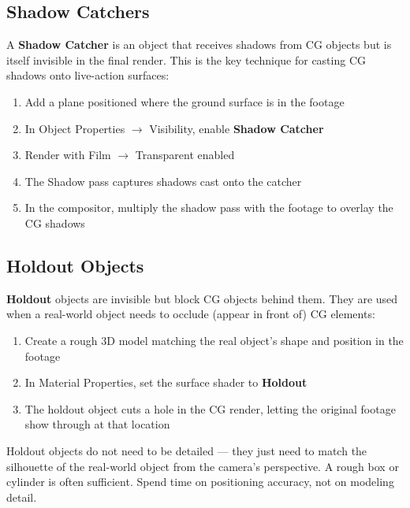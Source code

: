 \subsection{Shadow Catchers}

A \textbf{Shadow Catcher} is an object that receives shadows from CG objects but is itself invisible in the final render. This is the key technique for casting CG shadows onto live-action surfaces:

\begin{enumerate}[leftmargin=2em]
  \item Add a plane positioned where the ground surface is in the footage
  \item In Object Properties $\rightarrow$ Visibility, enable \textbf{Shadow Catcher}
  \item Render with Film $\rightarrow$ Transparent enabled
  \item The Shadow pass captures shadows cast onto the catcher
  \item In the compositor, multiply the shadow pass with the footage to overlay the CG shadows
\end{enumerate}

\subsection{Holdout Objects}

\textbf{Holdout} objects are invisible but block CG objects behind them. They are used when a real-world object needs to occlude (appear in front of) CG elements:

\begin{enumerate}[leftmargin=2em]
  \item Create a rough 3D model matching the real object's shape and position in the footage
  \item In Material Properties, set the surface shader to \textbf{Holdout}
  \item The holdout object cuts a hole in the CG render, letting the original footage show through at that location
\end{enumerate}

\begin{tipbox}
Holdout objects do not need to be detailed --- they just need to match the silhouette of the real-world object from the camera's perspective. A rough box or cylinder is often sufficient. Spend time on positioning accuracy, not on modeling detail.
\end{tipbox}

